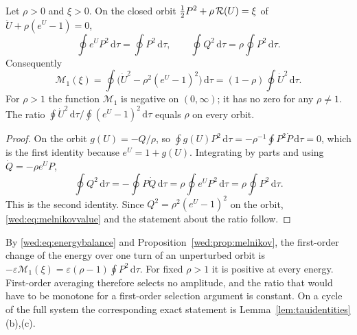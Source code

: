 \begin{proposition}\label{wed:prop:melnikov}
Let $\rho>0$ and $\xi>0$. On the closed orbit $\tfrac12P^2+\rho\,\mathcal R(U)=\xi$ of $\ddot U+\rho(e^U-1)=0$,
\begin{equation}\label{wed:eq:todaidentities}
\oint e^UP^2\,\mathrm d\tau=\oint P^2\,\mathrm d\tau,\qquad
\oint Q^2\,\mathrm d\tau=\rho\oint P^2\,\mathrm d\tau .
\end{equation}
Consequently
\begin{equation}\label{wed:eq:melnikovvalue}
\mathcal M_1(\xi)=\oint\bigl(\dot U^2-\rho^2(e^U-1)^2\bigr)\,\mathrm d\tau=(1-\rho)\oint\dot U^2\,\mathrm d\tau .
\end{equation}
For $\rho>1$ the function $\mathcal M_1$ is negative on $(0,\infty)$; it has no zero for any $\rho\neq1$. The ratio $\oint\dot U^2\,\mathrm d\tau\big/\oint(e^U-1)^2\,\mathrm d\tau$ equals $\rho$ on every orbit.
\end{proposition}
\begin{proof}
On the orbit $g(U)=-Q/\rho$, so $\oint g(U)P^2\,\mathrm d\tau=-\rho^{-1}\oint P^2\dot P\,\mathrm d\tau=0$, which is the first identity because $e^U=1+g(U)$. Integrating by parts and using $\dot Q=-\rho e^UP$,
\[
\oint Q^2\,\mathrm d\tau=-\oint P\dot Q\,\mathrm d\tau=\rho\oint e^UP^2\,\mathrm d\tau=\rho\oint P^2\,\mathrm d\tau .
\]
This is the second identity. Since $Q^2=\rho^2(e^U-1)^2$ on the orbit, \eqref{wed:eq:melnikovvalue} and the statement about the ratio follow.
\end{proof}

By \eqref{wed:eq:energybalance} and Proposition~\ref{wed:prop:melnikov}, the first-order change of the energy over one turn of an unperturbed orbit is $-\varepsilon\mathcal M_1(\xi)=\varepsilon(\rho-1)\oint P^2\,\mathrm d\tau$. For fixed $\rho>1$ it is positive at every energy. First-order averaging therefore selects no amplitude, and the ratio that would have to be monotone for a first-order selection argument is constant. On a cycle of the full system the corresponding exact statement is Lemma~\ref{lem:tauidentities}(b),(c).

